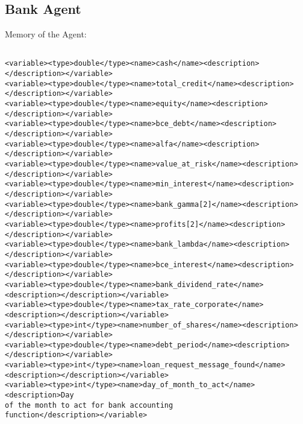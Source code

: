 \subsection{Bank Agent}
Memory of the Agent:
\begin{mylisting}
\begin{verbatim}

<variable><type>double</type><name>cash</name><description></description></variable>
<variable><type>double</type><name>total_credit</name><description></description></variable>
<variable><type>double</type><name>equity</name><description></description></variable>
<variable><type>double</type><name>bce_debt</name><description></description></variable>
<variable><type>double</type><name>alfa</name><description></description></variable>
<variable><type>double</type><name>value_at_risk</name><description></description></variable>
<variable><type>double</type><name>min_interest</name><description></description></variable>
<variable><type>double</type><name>bank_gamma[2]</name><description></description></variable>
<variable><type>double</type><name>profits[2]</name><description></description></variable>
<variable><type>double</type><name>bank_lambda</name><description></description></variable>
<variable><type>double</type><name>bce_interest</name><description></description></variable>
<variable><type>double</type><name>bank_dividend_rate</name><description></description></variable>
<variable><type>double</type><name>tax_rate_corporate</name><description></description></variable>
<variable><type>int</type><name>number_of_shares</name><description></description></variable>
<variable><type>double</type><name>debt_period</name><description></description></variable>
<variable><type>int</type><name>loan_request_message_found</name><description></description></variable>
<variable><type>int</type><name>day_of_month_to_act</name><description>Day
of the month to act for bank accounting
function</description></variable>

\end{verbatim}
\end{mylisting}

